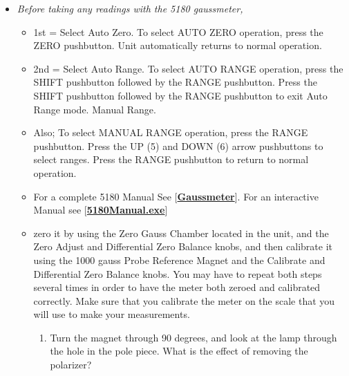 \documentclass{../lab}
\begin{document}
\begin{enumerate}
    \begin{itemize}
        \item \emph{Before taking any readings with the 5180 gaussmeter,}
        \begin{itemize}
            \item 1st = Select Auto Zero. To select AUTO ZERO operation, press the ZERO pushbutton. Unit automatically returns to normal operation.
        
            \item 2nd = Select Auto Range. To select AUTO RANGE operation, press the SHIFT pushbutton followed by the RANGE pushbutton. Press the SHIFT pushbutton followed by the RANGE pushbutton to exit Auto Range mode. Manual Range.
            
            \item Also; To select MANUAL RANGE operation, press the RANGE pushbutton. Press the UP (5) and DOWN (6) arrow pushbuttons to select ranges. Press the RANGE pushbutton to return to normal operation.
            
            \item For a complete 5180 Manual See [\href{http://physics111.lib.berkeley.edu/Physics111/Equipment\_Manuals/Gaussmeter5180.pdf}{\textbf{Gaussmeter}}]. For an interactive Manual see [\href{http://physics111.lib.berkeley.edu/Physics111/Reprints/HAL/5180Manual.exe}{\textbf{5180Manual.exe}}]
            
            \item zero it by using the Zero Gauss Chamber located in the unit, and the Zero Adjust and Differential Zero Balance knobs, and then calibrate it using the 1000 gauss Probe Reference Magnet and the Calibrate and Differential Zero Balance knobs. You may have to repeat both steps several times in order to have the meter both zeroed and calibrated correctly. Make sure that you calibrate the meter on the scale that you will use to make your measurements.
            \begin{enumerate}
                \item Turn the magnet through 90 degrees, and look at the lamp through the hole in the pole piece. What is the effect of removing the polarizer?
            

\end{enumerate}
\end{itemize}
\end{itemize}
\end{enumerate}
\end{document}
